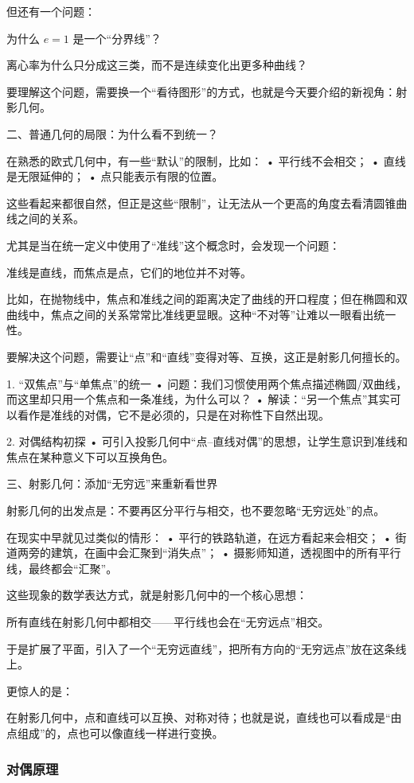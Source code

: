 但还有一个问题：

为什么 $e=1$ 是一个“分界线”？

离心率为什么只分成这三类，而不是连续变化出更多种曲线？

要理解这个问题，需要换一个“看待图形”的方式，也就是今天要介绍的新视角：射影几何。


二、普通几何的局限：为什么看不到统一？

在熟悉的欧式几何中，有一些“默认”的限制，比如：
	•	平行线不会相交；
	•	直线是无限延伸的；
	•	点只能表示有限的位置。

这些看起来都很自然，但正是这些“限制”，让无法从一个更高的角度去看清圆锥曲线之间的关系。

尤其是当在统一定义中使用了“准线”这个概念时，会发现一个问题：

准线是直线，而焦点是点，它们的地位并不对等。

比如，在抛物线中，焦点和准线之间的距离决定了曲线的开口程度；但在椭圆和双曲线中，焦点之间的关系常常比准线更显眼。这种“不对等”让难以一眼看出统一性。

要解决这个问题，需要让“点”和“直线”变得对等、互换，这正是射影几何擅长的。


1. “双焦点”与“单焦点”的统一
	•	问题：我们习惯使用两个焦点描述椭圆/双曲线，而这里却只用一个焦点和一条准线，为什么可以？
	•	解读：“另一个焦点”其实可以看作是准线的对偶，它不是必须的，只是在对称性下自然出现。

2. 对偶结构初探
	•	可引入投影几何中“点–直线对偶”的思想，让学生意识到准线和焦点在某种意义下可以互换角色。


三、射影几何：添加“无穷远”来重新看世界

射影几何的出发点是：不要再区分平行与相交，也不要忽略“无穷远处”的点。

在现实中早就见过类似的情形：
	•	平行的铁路轨道，在远方看起来会相交；
	•	街道两旁的建筑，在画中会汇聚到“消失点”；
	•	摄影师知道，透视图中的所有平行线，最终都会“汇聚”。

这些现象的数学表达方式，就是射影几何中的一个核心思想：

所有直线在射影几何中都相交——平行线也会在“无穷远点”相交。

于是扩展了平面，引入了一个“无穷远直线”，把所有方向的“无穷远点”放在这条线上。

更惊人的是：

在射影几何中，点和直线可以互换、对称对待；也就是说，直线也可以看成是“由点组成”的，点也可以像直线一样进行变换。

\subsubsection{对偶原理}

